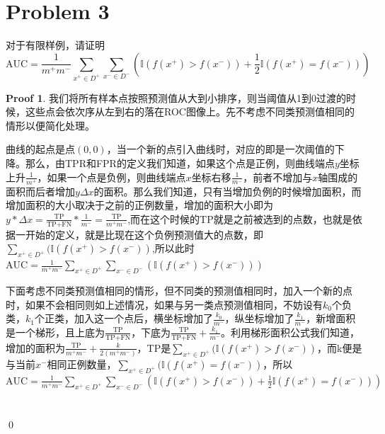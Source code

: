\documentclass[a4paper,UTF8]{article}
\theoremstyle{definition}
\newtheorem*{prove}{Proof}
\begin{document}
\section*{Problem 3}
对于有限样例，请证明
\[
\text{AUC} = \frac{1}{m^+m^-}\sum_{x^+\in D^+}\sum_{x^-\in D^-}\left(\mathbb{I}(f(x^+)>f(x^-))+\frac{1}{2}\mathbb{I}(f(x^+)=f(x^-))\right)
\]

\begin{prove}
\phantom{abc}

我们将所有样本点按照预测值从大到小排序，则当阈值从1到0过渡的时候，这些点会依次序从左到右的落在ROC图像上。先不考虑不同类预测值相同的情形以便简化处理。

曲线的起点是点$(0, 0)$，当一个新的点引入曲线时，对应的即是一次阈值的下降。那么，由TPR和FPR的定义我们知道，如果这个点是正例，则曲线端点$y$坐标上升$\frac{1}{m^+}$，如果一个点是负例，则曲线端点$x$坐标右移$\frac{1}{m^-}$，前者不增加与$x$轴围成的面积而后者增加$y\Delta x$的面积。那么我们知道，只有当增加负例的时候增加面积，而增加面积的大小取决于之前的正例数量，增加的面积大小即为$y*\Delta x = \frac{\text{TP}}{\text{TP}+\text{FN}} * \frac{1}{m^-} = \frac{\text{TP}}{m^+m^-}$,而在这个时候的TP就是之前被选到的点数，也就是依据一开始的定义，就是比现在这个负例预测值大的点数，即$\sum_{x^+\in D^+}(\mathbb{I}(f(x^+)>f(x^-))$,所以此时$\text{AUC} = \frac{1}{m^+m^-}\sum_{x^+\in D^+}\sum_{x^-\in D^-}\left(\mathbb{I}(f(x^+)>f(x^-))\right)$

下面考虑不同类预测值相同的情形，但不同类的预测值相同时，加入一个新的点时，如果不会相同则如上述情况，如果与另一类点预测值相同，不妨设有$k_0$个负类，$k_1$个正类，加入这一个点后，横坐标增加了$\frac{k_0}{m^-}$，纵坐标增加了$\frac{k_1}{m^-}$，新增面积是一个梯形，且上底为$\frac{\text{TP}}{\text{TP}+\text{FN}}$，下底为$\frac{\text{TP}}{\text{TP}+\text{FN}}+\frac{k_1}{m^-}$。利用梯形面积公式我们知道，增加的面积为$\frac{\text{TP}}{m^+m^-}+\frac{k}{2(m^+m^-)}$，TP是$\sum_{x^+\in D^+}(\mathbb{I}(f(x^+)>f(x^-))$，而k便是与当前$x^-$相同正例数量，$\sum_{x^+\in D^+}(\mathbb{I}(f(x^+)=f(x^-))$，所以$
\text{AUC} = \frac{1}{m^+m^-}\sum_{x^+\in D^+}\sum_{x^-\in D^-}\left(\mathbb{I}(f(x^+)>f(x^-))+\frac{1}{2}\mathbb{I}(f(x^+)=f(x^-))\right)
$
~\\
~\\
\qed
\end{prove}
\end{document}
